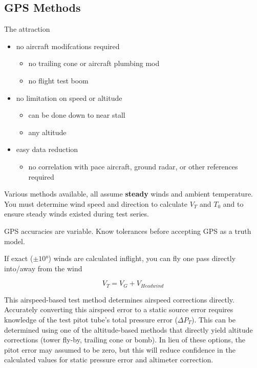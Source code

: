 \documentclass[
]{book}
\providecommand{\tightlist}{%
  \setlength{\itemsep}{0pt}\setlength{\parskip}{0pt}}
\begin{document}
\hypertarget{gps-methods}{%
\subsection{GPS Methods}\label{gps-methods}}

The attraction

\begin{itemize}
\tightlist
\item
  no aircraft modifcations required

  \begin{itemize}
  \tightlist
  \item
    no trailing cone or aircraft plumbing mod
  \item
    no flight test boom
  \end{itemize}
\item
  no limitation on speed or altitude

  \begin{itemize}
  \tightlist
  \item
    can be done down to near stall
  \item
    any altitude
  \end{itemize}
\item
  easy data reduction

  \begin{itemize}
  \tightlist
  \item
    no correlation with pace aircraft, ground radar, or other references required
  \end{itemize}
\end{itemize}

Various methods available, all assume \textbf{steady} winds and ambient temperature. You must determine wind speed and direction to calculate \(V_T\) and \(T_0\) and to ensure steady winds existed during test series.

GPS accuracies are variable. Know tolerances before accepting GPS as a truth model.

If exact (\(\pm 10°\)) winds are calculated inflight, you can fly one pass directly into/away from the wind

\[V_T = V_G + V_{Headwind}\]

This airspeed-based test method determines airspeed corrections directly. Accurately converting this airspeed error to a static source error requires knowledge of the test pitot tube's total pressure error (\(\Delta P_T\)). This can be determined using one of the altitude-based methods that directly yield altitude corrections (tower fly-by, trailing cone or bomb). In lieu of these options, the pitot error may assumed to be zero, but this will reduce confidence in the calculated values for static pressure error and altimeter correction.
\end{document}

